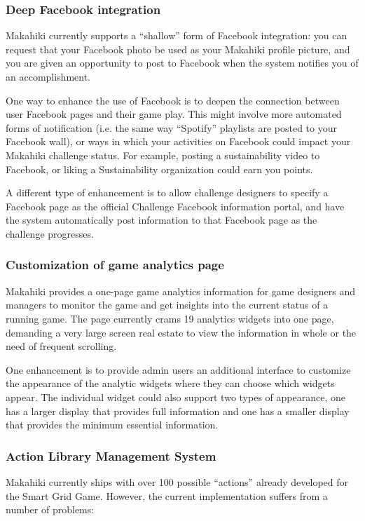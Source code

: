 \subsubsection{Deep Facebook integration}
Makahiki currently supports a ``shallow'' form of Facebook integration: you can request that your Facebook photo be used as your Makahiki profile picture, and you are given an opportunity to post to Facebook when the system notifies you of an accomplishment. 

One way to enhance the use of Facebook is to deepen the connection between user Facebook pages and their game play. This might involve more automated forms of notification (i.e. the same way ``Spotify'' playlists are posted to your Facebook wall), or ways in which your activities on Facebook could impact your Makahiki challenge status. For example, posting a sustainability video to Facebook, or liking a Sustainability organization could earn you points. 

A different type of enhancement is to allow challenge designers to specify a Facebook page as the official Challenge Facebook information portal, and have the system automatically post information to that Facebook page as the challenge progresses.

\subsubsection{Customization of game analytics page}
\label{sec:future-game-manage}
Makahiki provides a one-page game analytics information for game designers and managers to monitor the game and get insights into the current status of a running game. The page currently crams 19 analytics widgets into one page, demanding a very large screen real estate to view the information in whole or the need of frequent scrolling. 

One enhancement is to provide admin users an additional interface to customize the appearance of the analytic widgets where they can choose which widgets appear. The individual widget could also support two types of appearance, one has a larger display that provides full information and one has a smaller display that provides the minimum essential information. 

\subsubsection{Action Library Management System}
Makahiki currently ships with over 100 possible  ``actions'' already developed for the Smart Grid Game. However, the current implementation suffers from a number of problems:

